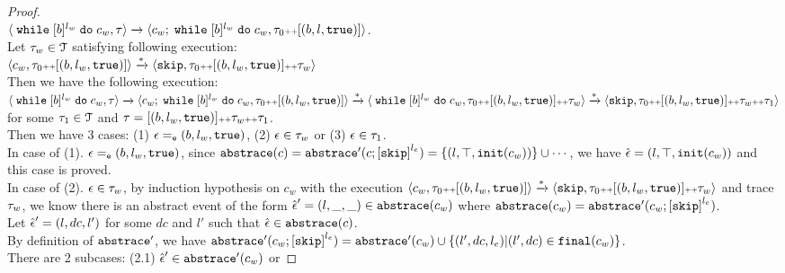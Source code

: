 \begin{proof}
    \\
    $\config{{\ewhile [b]^{l_w} \edo c_w, \trace}}
      \xrightarrow{} 
      \config{{
      c_w; \ewhile [b]^{l_w} \edo c_w,
      \trace_0 \tracecat [(b, l, \etrue)]}}
    $.
    \\
    Let $\trace_w \in \mathcal{T}$ satisfying following execution:
    \\
    $
    \config{{
    c_w,
    \trace_0 \tracecat [(b, l_w, \etrue)]}}
    \xrightarrow{*} 
    \config{{
    \eskip,
    \trace_0 \tracecat [(b, l_w, \etrue)] \tracecat \trace_w}}
  $
  \\
  Then we have the following execution:
  \\
  $\config{{\ewhile [b]^{l_w} \edo c_w, \trace}}
  \xrightarrow{} 
  \config{{
  c_w; \ewhile [b]^{l_w} \edo c_w,
  \trace_0 \tracecat [(b, l_w, \etrue)]}}
  \xrightarrow{*} 
  \config{{
    \ewhile [b]^{l_w} \edo c_w,
  \trace_0 \tracecat [(b, l_w, \etrue)] \tracecat \trace_w}}
  \xrightarrow{*} 
  \config{{
  \eskip,
  \trace_0 \tracecat [(b, l_w, \etrue)] \tracecat \trace_w \tracecat \trace_1}}
  $ for some $\trace_1 \in \mathcal{T}$ and $\trace = [(b, l_w, \etrue)] \tracecat \trace_w \tracecat \trace_1$.
  \\
  Then we have 3 cases: 
  (1) $\event \eventeq (b, l_w, \etrue)$, 
  (2) $\event \in \trace_w$ or 
  (3) $\event \in \trace_1$.
    \\
  In case of (1). $\event \eventeq (b, l_w, \etrue)$, since $\absflow(c) = \absflow'(c;\clabel{\eskip}^{l_e}) = \{(l, \top, \init(c_w))\} \cup \cdots $, we have $\absevent = (l, \top, \init(c_w))$ and this case is proved.
  \\
  In case of (2). $\event \in \trace_w$,
  by induction hypothesis on 
  $c_w$ with the execution 
    $\config{{
    c_w,
    \trace_0 \tracecat [(b, l_w, \etrue)]}}
    \xrightarrow{*} 
    \config{{
    \eskip,
    \trace_0 \tracecat [(b, l_w, \etrue)] \tracecat \trace_w}}$ and trace $\trace_w$, 
    we know there is an abstract event of the form 
    $\absevent' = (l, \_, \_ ) \in \absflow(c_w)$ where $\absflow(c_w) = \absflow'(c_w;\clabel{\eskip}^{l_e})$.
    \\
    Let $\absevent' = (l, dc, l')$ for some $dc$ and $l'$ such that $\absevent \in \absflow(c)$.
    \\
    By definition of $\absflow'$, we have 
    $ \absflow'(c_w;\clabel{\eskip}^{l_e}) = 
    \absflow'(c_w) \cup  \{ (l', dc, l_e) | (l', dc) \in \absfinal(c_w) \} $.
    \\
    There are 2 subcases: (2.1) $\absevent' \in \absflow'(c_w)$ or 

\end{proof}
